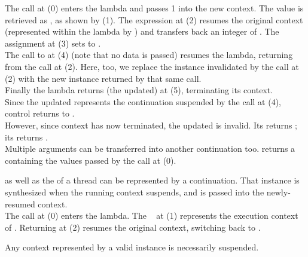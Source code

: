 
The  call at (0) enters the lambda and passes 1 into the
new context. The value is retrieved as , as shown by (1). The expression
 at (2) resumes the original context (represented
within the lambda by ) and transfers back an integer of .
The assignment at (3) sets  to .\\

The call to  at (4) (note that no data is passed) resumes the
lambda, returning from the  call at (2). Here, too,
we replace the \cont instance  invalidated by the \resume call at (2)
with the new instance returned by that same \resume call.\\

Finally the lambda returns (the updated)  at (5), terminating its
context.\\

Since the updated  represents the continuation suspended by the call at
(4), control returns to \main.\\

However, since context  has now terminated, the updated  is
invalid. Its \opbool returns ; its  returns
.\\

Multiple arguments can be transferred into another continuation too.
 returns a 
containing the values passed by the \callcc call at (0).


\label{subsec:main}

\main as well as the \entryfn of a thread can be represented by a continuation.
That \cont instance is synthesized when the running context suspends, and is
passed into the newly-resumed context.\\

The  call at (0) enters the lambda. The \cont\  at (1)
represents the execution context of \main. Returning  at (2) resumes the
original context, switching back to \main.


Any context represented by a valid \cont instance is necessarily suspended.\\

